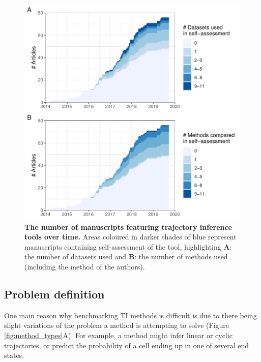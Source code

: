 \begin{figure}[htb!]
	\centering
	\includegraphics[width=.75\linewidth]{fig/self_assessment.pdf} 
	\caption{\textbf{The number of manuscripts featuring trajectory inference tools over time.} Areas coloured in darker shades of blue represent manuscripts containing self-assessment of the tool, highlighting \textbf{A}: the number of datasets used and \textbf{B}: the number of methods used (including the method of the authors).}
	\label{fig:benchmarks_over_time}
\end{figure}

\subsection{Problem definition}
One main reason why benchmarking TI methods is difficult is due to there being slight variations 
of the problem a method is attempting to solve (Figure \ref{fig:method_types}A). For example, a method might infer linear or cyclic trajectories, or predict the probability of a cell ending up in one of several end states.

